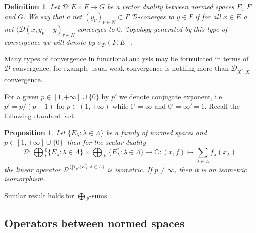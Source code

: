 \documentclass[12pt]{article}
\newtheorem{proposition}[theorem]{Proposition}
\newtheorem{definition}[theorem]{Definition}
\begin{document}
\begin{definition}\label{DefDConv} Let $\mathcal{D}:E\times F\to G$ be a vector duality between normed spaces $E$, $F$ and $G$. We say that a net $(y_\nu)_{\nu\in N}\subset F$ $\mathcal{D}$-conerges to $y\in F$ if for all $x\in E$ a net $(\mathcal{D}(x,y_\nu-y)_{\nu\in N}$ converges to $0$. Topology generated by this type of convergence we will denote by $\sigma_\mathcal{D}(F,E)$.
\end{definition}

Many types of convergence in functional analysis may be formulated in terms of $\mathcal{D}$-convergence, for example usual weak convergence is nothing more than $\mathcal{D}_{X^*,X}$-convergence. 

For a given $p\in[1,+\infty]\cup\{0\}$ by $p'$ we denote conjugate exponent, i.e. $p'=p/(p-1)$ for $p\in(1,+\infty)$ while $1'=\infty$ and $0'=\infty'=1$. Recall the following standard fact.

\begin{proposition}\label{PrSumDuality}
Let $\{E_\lambda:\lambda\in \Lambda\}$ be a family of normed spaces and $p\in[1,+\infty]\cup\{0\}$, then for the scalar duality
$$
\mathcal{D}:\bigoplus{}_p^0\{E_\lambda:\lambda\in \Lambda\}\times \bigoplus{}_{p'}\{E_\lambda^*:\lambda\in \Lambda\}\to \mathbb{C}: (x,f)\mapsto\sum\limits_{\lambda\in \Lambda} f_\lambda(x_\lambda)
$$
the linear operator $\mathcal{D}^{\bigoplus{}_{p'}\{E_\lambda^*:\lambda\in \Lambda\}}$ is isometric. If $p\neq\infty$, then it is an isometric isomorphism.
\end{proposition}

Similar result holds for $\bigoplus{}_p$-sums.
























\subsection{Operators between normed spaces}
\end{document}
